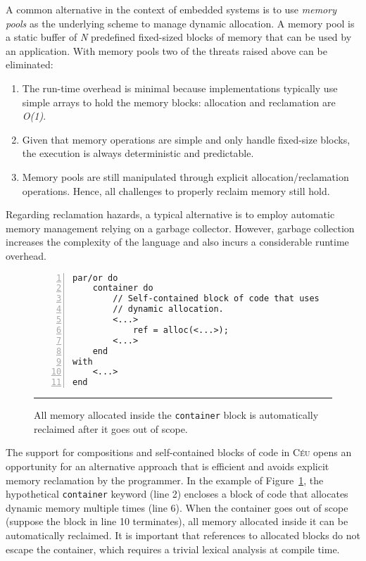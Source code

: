 \documentclass[pdftex,12pt,a4paper]{article}
\newcommand{\CEU}{\textsc{C\'{e}u}\xspace}
\newcommand{\code}[1] {{\small{\texttt{#1}}}}
\begin{document}
A common alternative in the context of embedded systems is to use \emph{memory 
pools} as the underlying scheme to manage dynamic allocation.
A memory pool is a static buffer of \emph{N} predefined fixed-sized blocks of 
memory that can be used by an application.
%
With memory pools two of the threats raised above can be eliminated:

\begin{enumerate}
\item
The run-time overhead is minimal because implementations typically use simple 
arrays to hold the memory blocks: allocation and reclamation are \emph{O(1)}.
\item
Given that memory operations are simple and only handle fixed-size blocks, the 
execution is always deterministic and predictable.
\item
Memory pools are still manipulated through explicit allocation/reclamation 
operations.
Hence, all challenges to properly reclaim memory still hold.
\end{enumerate}

Regarding reclamation hazards, a typical alternative is to employ automatic 
memory management relying on a garbage collector.
%
However, garbage collection increases the complexity of the language and also 
incurs a considerable runtime overhead.

\begin{figure}[t]
\begin{lstlisting}[numbers=left,xleftmargin=3em]
par/or do
    container do
        // Self-contained block of code that uses
        // dynamic allocation.
        <...>
            ref = alloc(<...>);
        <...>
    end
with
    <...>
end
\end{lstlisting}
\rule{13.8cm}{0.37pt}
\caption{
    All memory allocated inside the \code{container} block is automatically 
    reclaimed after it goes out of scope.
    \label{lst.container}
}
\end{figure}

The support for compositions and self-contained blocks of code in \CEU opens an 
opportunity for an alternative approach that is efficient and avoids explicit 
memory reclamation by the programmer.
%
In the example of Figure~\ref{lst.container}, the hypothetical \code{container} 
keyword (line 2) encloses a block of code that allocates dynamic memory 
multiple times (line 6).
When the container goes out of scope (suppose the block in line 10 terminates), 
all memory allocated inside it can be automatically reclaimed.
It is important that references to allocated blocks do not escape the 
container, which requires a trivial lexical analysis at compile time.
\end{document}
